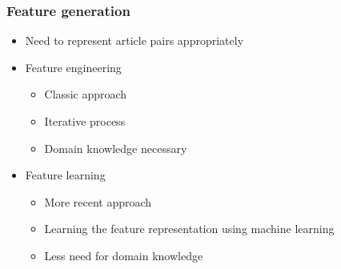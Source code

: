 \begin{frame}
    \frametitle{Feature generation}
    \centering
    \begin{itemize}
      \item Need to represent article pairs appropriately
      \item Feature engineering
        \begin{itemize}
          \item Classic approach
          \item Iterative process
          \item Domain knowledge necessary
        \end{itemize}
      \item Feature learning
        \begin{itemize}
          \item More recent approach
          \item Learning the feature representation using machine learning
          \item Less need for domain knowledge
        \end{itemize}
    \end{itemize}
\end{frame}
